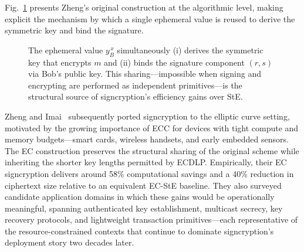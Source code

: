 \documentclass[conference]{IEEEtran}
\begin{document}
Fig.~\ref{fig:zheng_alg} presents Zheng's original construction at the algorithmic level, making explicit the mechanism by which a single ephemeral value is reused to derive the symmetric key and bind the signature.

\begin{figure}[t]
\centering
{}
\caption{The ephemeral value $y_B^{\,x}$ simultaneously (i) derives the symmetric key that encrypts $m$ and (ii) binds the signature component $(r, s)$ via Bob's public key. This sharing---impossible when signing and encrypting are performed as independent primitives---is the structural source of signcryption's efficiency gains over StE.}
\label{fig:zheng_alg}
\end{figure}

Zheng and Imai~\cite{zheng1998} subsequently ported signcryption to the elliptic curve setting, motivated by the growing importance of ECC for devices with tight compute and memory budgets---smart cards, wireless handsets, and early embedded sensors. The EC construction preserves the structural sharing of the original scheme while inheriting the shorter key lengths permitted by ECDLP. Empirically, their EC signcryption delivers around 58\% computational savings and a 40\% reduction in ciphertext size relative to an equivalent EC-StE baseline. They also surveyed candidate application domains in which these gains would be operationally meaningful, spanning authenticated key establishment, multicast secrecy, key recovery protocols, and lightweight transaction primitives---each representative of the resource-constrained contexts that continue to dominate signcryption's deployment story two decades later.
\end{document}
